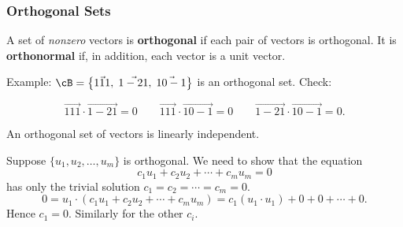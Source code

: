 
\begin{frame}
\frametitle{Orthogonal Sets}

\vskip-3mm
\begin{defn}
  A set of \emph{nonzero} vectors is \textbf{orthogonal} if each pair of vectors
  is orthogonal.
  \pause
  It is \textbf{orthonormal} if, in addition, each vector is a unit vector.
\end{defn}

\pause\medskip
\alert{Example:} $\cB = \left\{\vec{1 1 1},\;\vec{1 -2 1},\;\vec{1 0 -1}\right\}$
is an orthogonal set.  Check:
\begin{webonly}
  \[ \vec{1 1 1}\cdot\vec{1 -2 1} = 0 \qquad \vec{1 1 1}\cdot\vec{1 0 -1} = 0
  \qquad \vec{1 -2 1}\cdot\vec{1 0 -1} = 0. \]
\end{webonly}

\pause\vskip-3mm
\begin{lem}
  An orthogonal set of vectors is linearly independent.
\end{lem}

\begin{webonly}\medskip
\displayskips{5pt}
Suppose $\{u_1,u_2,\ldots,u_m\}$ is orthogonal.  We need to show that the
equation
\[ c_1u_1 + c_2u_2 + \cdots + c_mu_m = 0 \]
has only the trivial solution $c_1=c_2=\cdots=c_m=0$.
\[ 0 = u_1\cdot(c_1u_1 + c_2u_2 + \cdots + c_mu_m)
= c_1(u_1\cdot u_1) + 0 + 0 + \cdots + 0. \]
Hence $c_1=0$.  Similarly for the other $c_i$.
\end{webonly}

\end{frame}



